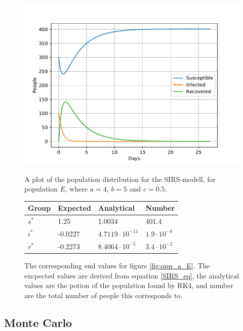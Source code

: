 \documentclass[a4paper]{article}
\let\Oldsubsection\subsection
\renewcommand{\subsection}{\FloatBarrier\Oldsubsection}
\begin{document}
\begin{figure}
	\centering
	\begin{minipage}{0.49\textwidth}
		\centering
		\includegraphics[scale=0.6]{../plots/opp_a_E.pdf}
		\caption{A plot of the population distribution for the SIRS-modell, for population $E$, where $a=4$, $b=5$ and $c=0.5$. }\label{fig:opp_a_E}
	\end{minipage}
	\begin{minipage}{0.49\textwidth}
		\centering
		\captionsetup{type=table} %
		\begin{tabular}{|l|l|l|l|}
			\hline
			Group & Expected & Analytical   & Number  \\ \hline
			$s^*$ & 1.25 & 1.0034 & 401.4 \\ \hline
			$i^*$ & -0.0227 & $4.7119\cdot 10^{-11}$ & $1.9\cdot 10^{-8}$ \\ \hline
			$r^*$ & -0.2273 & $8.4064\cdot 10^{-5}$ & $3.4\cdot 10^{-2}$ \\ \hline
		\end{tabular}
		\caption{The corresponding end values for figure \ref{fig:opp_a_E}. The excpected values are derived from equation \ref{SIRS_eq}, the analytical values are the potion of the population found by RK4, and number are the total number  of people this corresponds to.}\label{tab:opp_a_E}
	\end{minipage}
\end{figure}


\subsection{Monte Carlo}
\end{document}
